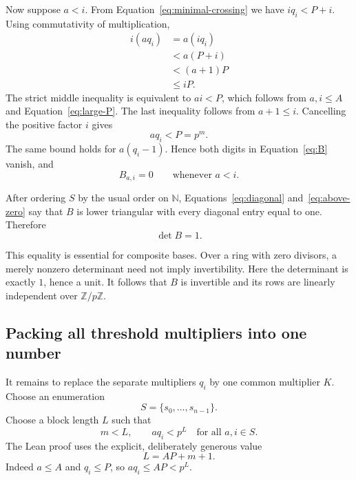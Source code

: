 \documentclass[11pt]{article}
\newcommand{\N}{\mathbb{N}}
\newcommand{\Z}{\mathbb{Z}}
\newcommand{\Zmod}[1]{\Z/#1\Z}
\begin{document}
Now suppose $a<i$. From Equation~\eqref{eq:minimal-crossing} we have
$iq_i<P+i$. Using commutativity of multiplication,
\begin{align*}
  i(aq_i)
  &=a(iq_i)\\
  &<a(P+i)\\
  &<(a+1)P\\
  &\le iP.
\end{align*}
The strict middle inequality is equivalent to $ai<P$, which follows from
$a,i\le A$ and Equation~\eqref{eq:large-P}. The last inequality follows from
$a+1\le i$. Cancelling the positive factor $i$ gives
\begin{equation}
  aq_i<P=p^m.
  \label{eq:off-diagonal-bound}
\end{equation}
The same bound holds for $a(q_i-1)$. Hence both digits in
Equation~\eqref{eq:B} vanish, and
\begin{equation}
  B_{a,i}=0
  \qquad\text{whenever }a<i.
  \label{eq:above-zero}
\end{equation}

After ordering $S$ by the usual order on $\N$,
Equations~\eqref{eq:diagonal} and~\eqref{eq:above-zero} say that $B$ is lower
triangular with every diagonal entry equal to one. Therefore
\begin{equation}
  \det B=1.
  \label{eq:det-one}
\end{equation}

This equality is essential for composite bases. Over a ring with zero
divisors, a merely nonzero determinant need not imply invertibility. Here the
determinant is exactly $1$, hence a unit. It follows that $B$ is invertible and
its rows are linearly independent over $\Zmod p$.

\subsection{Packing all threshold multipliers into one number}

It remains to replace the separate multipliers $q_i$ by one common multiplier
$K$. Choose an enumeration
\[
  S=\{s_0,\ldots,s_{n-1}\}.
\]
Choose a block length $L$ such that
\begin{equation}
  m<L,
  \qquad
  aq_i<p^L
  \quad\text{for all }a,i\in S.
  \label{eq:block-bound}
\end{equation}
The Lean proof uses the explicit, deliberately generous value
\begin{equation}
  L=AP+m+1.
  \label{eq:L}
\end{equation}
Indeed $a\le A$ and $q_i\le P$, so $aq_i\le AP<p^L$.
\end{document}
